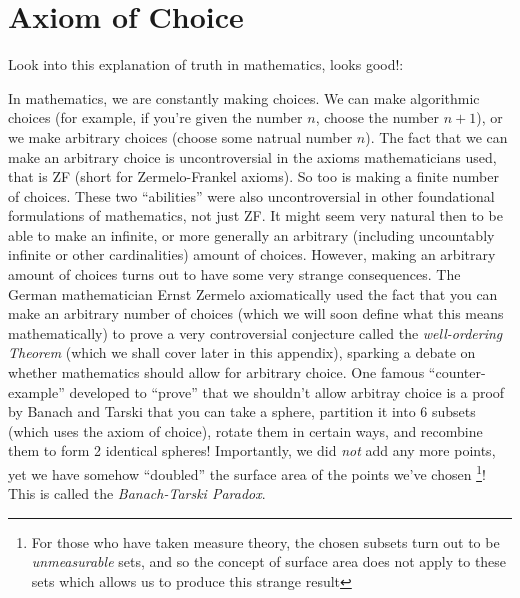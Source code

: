 \documentclass[oneside]{book}
\begin{document}
\section{Axiom of Choice}\label{sec:axiomOfChoice}
Look into this explanation of truth in mathematics, looks good!: %


In mathematics, we are constantly making choices. We can make algorithmic choices (for example, if you're given the
number $n$, choose the number $n+1$), or we make arbitrary choices (choose some natrual number $n$). The fact that we can
make an arbitrary choice is uncontroversial in the axioms mathematicians used, that is ZF (short for
Zermelo-Frankel axioms). So too is making a finite number of choices. These two ``abilities'' were also uncontroversial
in other foundational formulations of mathematics, not just ZF. It might seem very natural then to be able to make an
infinite, or more generally an arbitrary (including uncountably infinite or other cardinalities) amount of choices.
However, making an arbitrary amount of choices turns out to have some very strange consequences. The German
mathematician Ernst Zermelo axiomatically used the fact that you can make an arbitrary number of choices (which we will
soon define what this means mathematically) to prove a very controversial conjecture called the \emph{well-ordering
Theorem} (which we shall cover later in this appendix), sparking a debate on whether mathematics should allow for
arbitrary choice. One famous ``counter-example'' developed to ``prove'' that we shouldn't allow arbitray choice is
a proof by Banach and Tarski that you can take a sphere, partition it into 6 subsets (which uses the axiom of choice),
rotate them in certain ways, and recombine them to form 2 identical spheres! Importantly, we did \emph{not} add any more
points, yet we have somehow ``doubled'' the surface area of the points we've chosen \footnote{For those who have taken
measure theory, the chosen subsets turn out to be \emph{unmeasurable} sets, and so the concept of surface area does not
apply to these sets which allows us to produce this strange result}! This is called the \emph{Banach-Tarski Paradox}.
\end{document}

